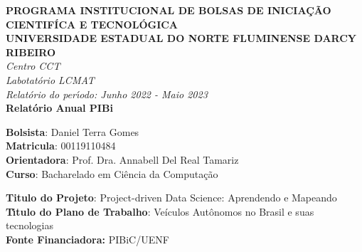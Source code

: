 \documentclass[
	12pt,				%
	openany, %
	a4paper,			%
	english,			%
	french,				%
	spanish,			%
	brazil				%
	]{abntex2}
\begin{document}
\begin{center}
\large
\textbf{PROGRAMA INSTITUCIONAL DE BOLSAS DE INICIA\c{C}\~{A}O CIENTIF\'{I}CA E TECNOL\'{O}GICA\\\vspace{0,5cm}
UNIVERSIDADE ESTADUAL DO NORTE FLUMINENSE DARCY RIBEIRO\\
}
\textit{Centro CCT \\
Labotat\'{o}rio LCMAT\\
\vspace{1cm}
Relat\'{o}rio do per\'{\i}odo: Junho 2022 - Maio 2023}\\
\vspace{1,5cm}
\textbf{Relat\'{o}rio Anual PIBi}\\\vspace{5cm}
\end{center}
\textbf{Bolsista}: Daniel Terra Gomes\\
\textbf{Matricula}: 00119110484\\
\textbf{Orientadora}: Prof. Dra. Annabell Del Real Tamariz  \\
\textbf{Curso}: Bacharelado em Ci\^{e}ncia da Computa\c{c}\~{a}o\\
\vspace{3cm}
\begin{center}
\textbf{Titulo do Projeto}: Project-driven Data Science: Aprendendo e Mapeando\\
\textbf{T\'{\i}tulo do Plano de Trabalho}: Veículos Autônomos no Brasil e suas tecnologias\\
\textbf{Fonte Financiadora:} PIBiC/UENF
\end{center}




\frenchspacing




\end{document}
